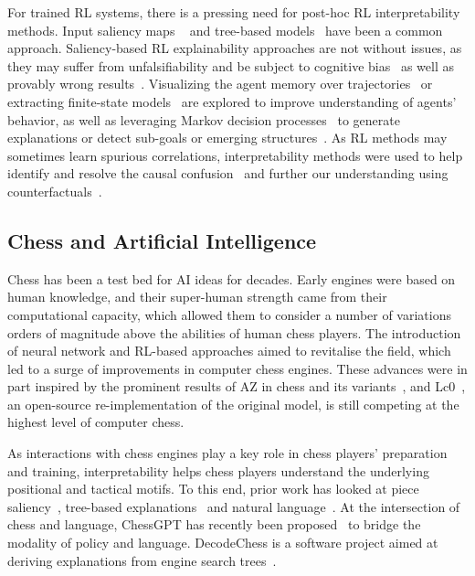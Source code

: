 \documentclass{article}
\begin{document}
For trained RL systems, there is a pressing need for post-hoc RL interpretability methods. Input saliency maps ~\citep{wang2016dueling, Selvaraju_2019, greydanus2018visualizing, mundhenk2020efficient} and tree-based models~\citep{bastani2018verifiable, roth2019conservative, coppens2019distilling, liu2019toward, vasic2019moet, madumal2020distal} have been a common approach.
Saliency-based RL explainability approaches are not without issues, as they may suffer from unfalsifiability and be subject to cognitive bias~\citep{atrey2019exploratory} as well as provably wrong results~\citep{bilodeau2022impossibility}.
Visualizing the agent memory over trajectories~\citep{jaunet2020drlviz} or extracting finite-state models~\citep{koul2018learning} are explored to improve understanding of agents' behavior, as well as leveraging Markov decision processes~\citep{finkelstein2022explainable, zahavy2016graying} to generate explanations or detect sub-goals or emerging structures~\citep{rupprecht2019finding}. 
As RL methods may sometimes learn spurious correlations, interpretability methods were used to help identify and resolve the causal confusion~\citep{gajcin2022reccover} and further our understanding using counterfactuals~\citep{deshmukh2023counterfactual, olson2019counterfactual}. 

\subsection{Chess and Artificial Intelligence}
Chess has been a test bed for AI ideas for decades.
Early engines were based on human knowledge, and their super-human strength came from their computational capacity, which allowed them to consider a number of variations orders of magnitude above the abilities of human chess players. 
The introduction of neural network and RL-based approaches aimed to revitalise the field, which led to a surge of improvements in computer chess engines. These advances were in part inspired by the prominent results of AZ in chess and its variants~\citep{Silver1140, az_variants_preprint, CACM-paper, zahavy2023diversifying}, and Lc0~\citep{leela}, an open-source re-implementation of the original model, is still competing at the highest level of computer chess. 

As interactions with chess engines play a key role in chess players' preparation and training, interpretability helps chess players understand the underlying positional and tactical motifs. To this end, prior work has looked at piece saliency~\citep{puri2020explain}, tree-based explanations~\citep{10.1007/3-540-60364-6_40} and natural language~\citep{jhamtani2018acl}. At the intersection of chess and language, ChessGPT has recently been proposed~\citep{feng2023chessgpt} to bridge the modality of policy and language. DecodeChess is a software project aimed at deriving explanations from engine search trees~\citep{decodechess}. 
\end{document}
